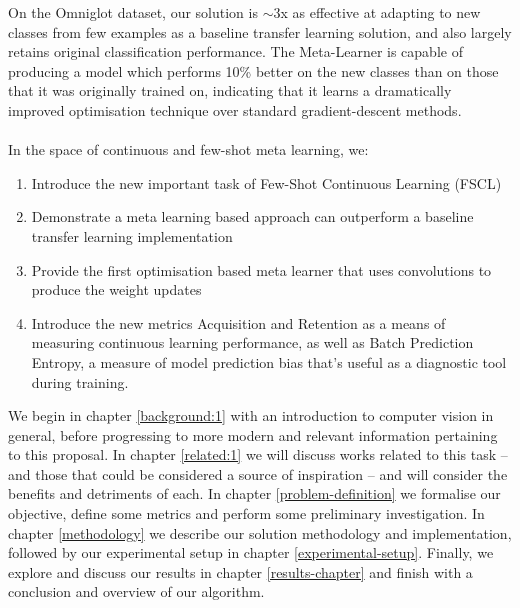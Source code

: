 \documentclass{report}
\begin{document}
On the Omniglot\parencite{omniglot} dataset, our solution is $\sim$3x as effective at adapting to new classes from few examples as a baseline transfer learning solution, and also largely retains original classification performance. The Meta-Learner is capable of producing a model which performs 10\% better on the new classes than on those that it was originally trained on, indicating that it learns a dramatically improved optimisation technique over standard gradient-descent methods.  \\ \\

In the space of continuous and few-shot meta learning, we:
\begin{enumerate}
	\item Introduce the new important task of Few-Shot Continuous Learning (FSCL)
	\item Demonstrate a meta learning based approach can outperform a baseline transfer learning implementation
	\item Provide the first optimisation based meta learner that uses convolutions to produce the weight updates
	\item Introduce the new metrics Acquisition and Retention as a means of measuring continuous learning performance, as well as Batch Prediction Entropy, a measure of model prediction bias that's useful as a diagnostic tool during training.
\end{enumerate}



We begin in chapter \ref{background:1} with an introduction to computer vision in general, before progressing to more modern and relevant information pertaining to this proposal. In chapter \ref{related:1} we will discuss works related to this task -- and those that could be considered a source of inspiration -- and will consider the benefits and detriments of each. In chapter \ref{problem-definition} we formalise our objective, define some metrics and perform some preliminary investigation. In chapter \ref{methodology} we describe our solution methodology and implementation, followed by our experimental setup in chapter \ref{experimental-setup}. Finally, we explore and discuss our results in chapter \ref{results-chapter} and finish with a conclusion and overview of our algorithm. \par
\end{document}
